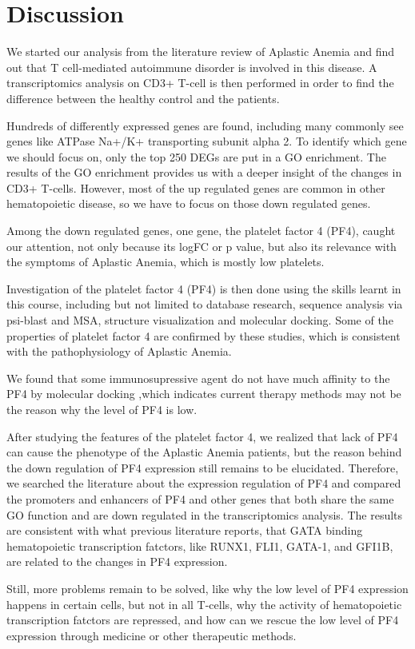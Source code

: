 \section{Discussion}

We started our analysis from the literature review of Aplastic Anemia and find out that T cell-mediated autoimmune disorder is involved in this disease. A transcriptomics analysis on CD3+ T-cell is then performed in order to find the difference between the healthy control and the patients. 

Hundreds of differently expressed genes are found, including many commonly see genes like ATPase Na+/K+ transporting subunit alpha 2. To identify which gene we should focus on, only the top 250 DEGs are put in a GO enrichment. The results of the GO enrichment provides us with a deeper insight of the changes in CD3+ T-cells. However, most of the up regulated genes are common in other hematopoietic disease, so we have to focus on those down regulated genes.

Among the down regulated genes, one gene, the platelet factor 4 (PF4), caught our attention, not only because its logFC or p value, but also its relevance with the symptoms of Aplastic Anemia, which is mostly low platelets. 

Investigation of the platelet factor 4 (PF4) is then done using the skills learnt in this course, including but not limited to database research, sequence analysis via psi-blast and MSA, structure visualization and molecular docking.  Some of the properties of platelet factor 4 are confirmed by these studies, which is consistent with the pathophysiology of Aplastic Anemia.

We found that some immunosupressive agent do not have much affinity to the PF4 by molecular docking ,which indicates current therapy methods may not be the reason why the level of PF4 is low.

After studying the features of the platelet factor 4, we realized that lack of PF4 can cause the phenotype of the Aplastic Anemia patients, but the reason behind the down regulation of PF4 expression still remains to be elucidated. Therefore, we searched the literature about the expression regulation of PF4 and compared the promoters and enhancers of PF4 and other genes that both share the same GO function and are down regulated in the transcriptomics analysis. The results are consistent with what previous literature reports, that GATA binding hematopoietic transcription fatctors, like RUNX1, FLI1, GATA-1, and GFI1B, are related to the changes in PF4 expression.\cite{aneja2011mechanism}

Still, more problems remain to be solved, like why the low level of PF4 expression happens in certain cells, but not in all T-cells, why the activity of hematopoietic transcription fatctors are repressed, and how can we rescue the low level of PF4 expression through medicine or other therapeutic methods.